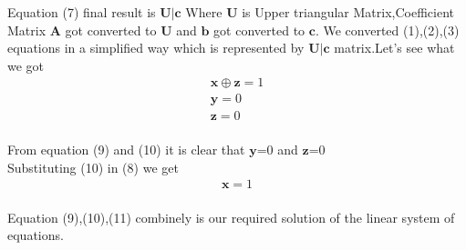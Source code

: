 \documentclass[journal,12pt,twocolumn]{IEEEtran}
\begin{document}
Equation (7) final result is $\mathbf{U}|\mathbf{c}$
Where $\mathbf{U}$ is Upper triangular Matrix,Coefficient Matrix $\mathbf{A}$ got converted to $\mathbf{U}$ and $\mathbf{b}$ got converted to $\mathbf{c}$.
We converted (1),(2),(3) equations in a simplified way which is represented by $\mathbf{U}|\mathbf{c}$ matrix.Let's see what we got\\
\begin{align}
    \mathbf{x}\oplus\mathbf{z}=1\\
     \mathbf{y}=0\\
      \mathbf{z}=0
\end{align}\\
From equation (9) and (10) it is clear that $\mathbf{y}$=0 and $\mathbf{z}$=0\\
Substituting (10) in (8) we get \\
\begin{align}
    \mathbf{x}=1
\end{align}\\

Equation (9),(10),(11) combinely is our required solution of the linear system of equations. 
\end{document}
